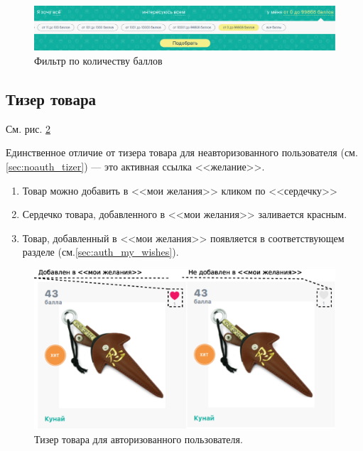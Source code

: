             
            \begin{figure}
                \center
                \includegraphics[width=170mm]{04_auth_funcs/figures/02.eps}
                \caption{Фильтр по количеству баллов}
                \label{fig:auth_filter}
            \end{figure}
        
        \subsection{Тизер товара}
            \label{sec:auth_tizer}
            См. рис. \ref{fig:auth_tizer}
        
            Единственное отличие от тизера товара для неавторизованного 
            пользователя (см. \ref{sec:noauth_tizer})
            --- это активная ссылка <<желание>>.
            \begin{enumerate}
                \item Товар можно добавить в <<мои желания>> кликом по 
                <<сердечку>>
                \item Сердечко товара, добавленного в <<мои желания>> 
                заливается красным.
                \item Товар, добавленный в <<мои желания>> появляется в 
                соответствующем разделе (см.\ref{sec:auth_my_wishes}).
            \end{enumerate}

        
            \begin{figure}
                \center
                \includegraphics[width=170mm]{04_auth_funcs/figures/03.eps}
                \caption{Тизер товара для авторизованного пользователя.}
                \label{fig:auth_tizer}
            \end{figure}
        
